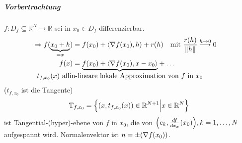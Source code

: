 \documentclass{scrreprt}
\newcommand\skalprod[1]{\left\langle #1 \right\rangle}
\begin{document}
\subparagraph{Vorbertrachtung} $f \colon D_f \subseteq \mathbb{R}^N \to \mathbb{R}$
sei in $x_0 \in D_f$ differenzierbar.
\begin{align*}
  \Rightarrow f(\underset{= x}{\underbrace{x_0 + h}})
  &= f\qty(x_0) + \skalprod{\nabla f\qty(x_0), h}
    + r(h) \quad \text{mit } \frac{r(h)}{\norm{h}} \overset{h \to 0}\longrightarrow 0 & \\
  f(x) &= \underset{\makebox[0pt]{$t_{f, x_0}(x)$ affin-lineare lokale Approximation von $f$ in $x_0$}}{
         \underbrace{f\qty(x_0) + \skalprod{\nabla f\qty(x_0), x - x_0}}
         } + \ldots
\end{align*}
($t_{f,x_0}$ ist die Tangente)
\[
  \mathbb{T}_{f, x_0} = \qty{\qty(x, t_{f, x_0}(x)) \in \mathbb{R}^{N + 1} {\Big |} x \in \mathbb{R}^N}
\]
ist Tangential-(hyper)-ebene von $f$ in $x_0$, die von
$\qty(e_k, \frac{df}{dx_x}(x_0)), k = 1, \ldots, N$ aufgespannt wird.
Normalenvektor ist $n = \pm \qty(\nabla f\qty(x_0))$.
\end{document}
